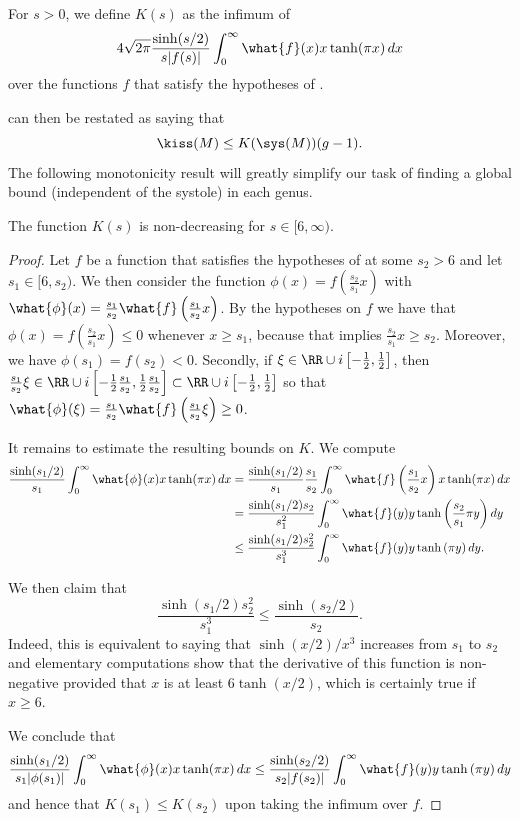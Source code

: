 \documentclass[12pt]{amsart}
\numberwithin{equation}{section}
\begin{document}
\begin{defn}
For $s>0$, we define $K(s)$ as the infimum of 
\[
4\sqrt{2\pi} \frac{\sinh(s/2)}{s| f(s)|} \int_0^\infty \what{f}(x) x\tanh(\pi x) \,dx
\]
over the functions $f$ that satisfy the hypotheses of . 
\end{defn}

 can then be restated as saying that 
\[
\kiss(M) \leq K(\sys(M)) (g-1).
\]
The following monotonicity result will greatly simplify our task of finding a global bound (independent of the systole) in each genus.

\begin{lem}  \label{lem:non-decreasing}
The function $K(s)$ is non-decreasing for $s\in [6,\infty)$.
\end{lem}
\begin{proof}
Let $f$ be a function that satisfies the hypotheses of  at some $s_2> 6$ and let $s_1 \in [6, s_2)$. We then consider the function $\phi(x) = f\left(\frac{s_2}{s_1} x \right)$ with $\what{\phi}(x) = \frac{s_1}{s_2} \what{f}\left( \frac{s_1}{s_2} x\right)$. By the hypotheses on $f$ we have that $\phi(x) = f\left(\frac{s_2}{s_1} x \right) \leq 0$ whenever $x\geq s_1$, because that implies $\frac{s_2}{s_1} x \geq s_2$. Moreover, we have $\phi(s_1) = f(s_2)<0$. Secondly, if $\xi \in \RR \cup i \left[-\frac12,\frac12\right]$, then $\frac{s_1}{s_2} \xi \in \RR \cup i \left[-\frac12 \frac{s_1}{s_2},\frac12 \frac{s_1}{s_2}\right] \subset \RR \cup i \left[-\frac12,\frac12\right]$ so that $\what{\phi}(\xi) = \frac{s_1}{s_2} \what{f}\left( \frac{s_1}{s_2} \xi\right) \geq 0$.

It remains to estimate the resulting bounds on $K$. We compute
\begin{align*}
\frac{\sinh(s_1/2)}{s_1}\int_0^\infty \what{\phi}(x) x \tanh(\pi x) \,dx &= \frac{\sinh(s_1/2)}{s_1} \frac{s_1}{s_2} \int_0^\infty \what{f}\left( \frac{s_1}{s_2} x\right) x \tanh(\pi x) \,dx \\
&= \frac{\sinh(s_1/2) s_2}{s_1^2} \int_0^\infty \what{f}(y) y \tanh\left( \frac{s_2}{s_1} \pi y  \right)dy \\
&\leq \frac{\sinh(s_1/2) s_2^2}{s_1^3} \int_0^\infty \what{f}(y) y \tanh\left( \pi y  \right)dy.
\end{align*}

We then claim that
\[
\frac{\sinh(s_1/2) s_2^2}{s_1^3} \leq \frac{\sinh(s_2/2)}{s_2}.
\]
Indeed, this is equivalent to saying that $\sinh(x/2)/x^3$ increases from $s_1$ to $s_2$ and elementary computations show that the derivative of this function is non-negative provided that $x$ is at least $6 \tanh(x/2)$, which is certainly true if $x \geq 6$.

We conclude that
\[
\frac{\sinh(s_1/2)}{s_1 |\phi(s_1)|}\int_0^\infty \what{\phi}(x) x \tanh(\pi x) \,dx \leq \frac{\sinh(s_2/2)}{s_2|f(s_2)|} \int_0^\infty \what{f}(y) y \tanh\left( \pi y  \right)dy
\]
and hence that $K(s_1) \leq K(s_2)$ upon taking the infimum over $f$.
\end{proof}
\end{document}
